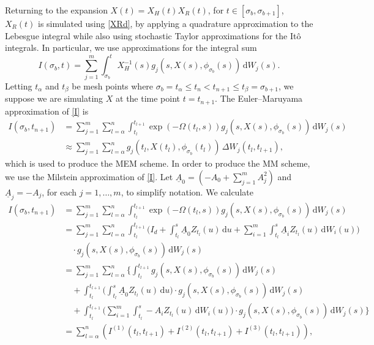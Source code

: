 \documentclass[onefignum]{siamart250211}
\begin{document}
Returning to the expansion $X(t)=X_H(t)X_R(t)$, for $t\in[\sigma_b,\sigma_{b+1}]$, $X_R(t)$ is simulated using \cref{XRd}, by applying a quadrature approximation to the Lebesgue integral while also using stochastic Taylor approximations for the It\^o integrals. In particular, we use approximations for the integral sum
\begin{equation}
I(\sigma_b,t)=\sum_{j=1}^m\int_{\sigma_b}^tX_H^{-1}(s)g_j(s,X(s),\phi_{\sigma_b}(s))\,\mathrm{d}W_j(s).\label{I}
\end{equation}
Letting $t_\alpha$ and $t_\beta$ be mesh points where $\sigma_b=t_\alpha\leqslant t_n<t_{n+1}\leqslant t_\beta=\sigma_{b+1}$, we suppose we are simulating $X$ at the time point $t=t_{n+1}$. The Euler--Maruyama approximation of \cref{I} is
\begin{align*}
I(\sigma_b,t_{n+1})&=\sum_{j=1}^m\sum_{l=\alpha}^n\int_{t_l}^{t_{l+1}}\exp(-\Omega(t_l,s))g_j(s,X(s),\phi_{\sigma_b}(s))\,\mathrm{d}W_j(s)\\
&\approx\sum_{j=1}^m\sum_{l=\alpha}^ng_j(t_l,X(t_l),\phi_{\sigma_b}(t_l))\,\Delta W_j(t_l,t_{l+1}),%
\end{align*}
which is used to produce the MEM scheme. In order to produce the MM scheme, we use the Milstein approximation of \cref{I}. Let $\underline{A}_0=\left(-A_0+\sum_{j=1}^mA_j^2\right)$ and $\underline{A}_j=-A_j$, for each $j=1,\ldots,m$, to simplify notation. We calculate
\begin{align}
I(\sigma_b,t_{n+1})&=\sum_{j=1}^m\sum_{l=\alpha}^n\int_{t_l}^{t_{l+1}}\exp(-\Omega(t_l,s))g_j(s,X(s),\phi_{\sigma_b}(s))\,\mathrm{d}W_j(s)\nonumber\\
&=\sum_{j=1}^m\sum_{l=\alpha}^n\int_{t_l}^{t_{l+1}}\bigg(I_d+\int_{t_l}^s\underline{A}_0Z_{t_l}(u)\,\mathrm{d}u+\sum_{i=1}^m\int_{t_l}^s\underline{A}_iZ_{t_l}(u)\,\mathrm{d}W_i(u)\bigg)\label{Isum}\\
&\quad\cdot g_j(s,X(s),\phi_{\sigma_b}(s))\,\mathrm{d}W_j(s)\nonumber\\
&=\sum_{j=1}^m\sum_{l=\alpha}^n\bigg\{\int_{t_l}^{t_{l+1}}g_j(s,X(s),\phi_{\sigma_b}(s))\,\mathrm{d}W_j(s)\nonumber\\
&\quad+\int_{t_l}^{t_{l+1}}\bigg(\int_{t_l}^s\underline{A}_0Z_{t_l}(u)\,\mathrm{d}u\bigg)\cdot g_j(s,X(s),\phi_{\sigma_b}(s))\,\mathrm{d}W_j(s)\nonumber\\
&\quad+\int_{t_l}^{t_{l+1}}\bigg(\sum_{i=1}^m\int_{t_l}^s-A_iZ_{t_l}(u)\,\mathrm{d}W_i(u)\bigg)\cdot g_j(s,X(s),\phi_{\sigma_b}(s))\,\mathrm{d}W_j(s)\bigg\}\nonumber\\
&=\sum_{l=\alpha}^n\left(I^{(1)}(t_l,t_{l+1})+I^{(2)}(t_l,t_{l+1})+I^{(3)}(t_l,t_{l+1})\right),\nonumber
\end{align}
\end{document}
